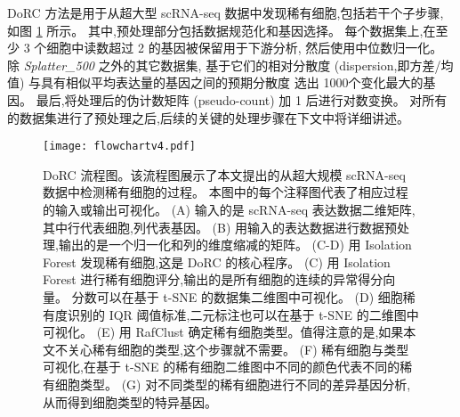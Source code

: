 DoRC 方法是用于从超大型 scRNA-seq 数据中发现稀有细胞,包括若干个子步骤,如图 \ref{fig:flowchart} 所示。
其中,预处理部分包括数据规范化和基因选择。
每个数据集上,在至少 3 个细胞中读数超过 2 的基因被保留用于下游分析,
然后使用中位数归一化。
除 \textit{Splatter\_500} 之外的其它数据集,
基于它们的相对分散度 (dispersion,即方差/均值) 与具有相似平均表达量的基因之间的预期分散度 选出 1000个变化最大的基因。
最后,将处理后的伪计数矩阵 (pseudo-count) 加 1 后进行对数变换。
对所有的数据集进行了预处理之后,后续的关键的处理步骤在下文中将详细讲述。

\begin{figure}[!htbp]
    \centering
    \texttt{[image: flowchartv4.pdf]}
    \caption{DoRC 流程图。该流程图展示了本文提出的从超大规模 scRNA-seq 数据中检测稀有细胞的过程。
    本图中的每个注释图代表了相应过程的输入或输出可视化。
    (A) 输入的是 scRNA-seq 表达数据二维矩阵,其中行代表细胞,列代表基因。
    (B) 用输入的表达数据进行数据预处理,输出的是一个归一化和列的维度缩减的矩阵。
    (C-D) 用 Isolation Forest 发现稀有细胞,这是 DoRC 的核心程序。
    (C) 用 Isolation Forest 进行稀有细胞评分,输出的是所有细胞的连续的异常得分向量。
    分数可以在基于 t-SNE 的数据集二维图中可视化。
    (D) 细胞稀有度识别的 IQR 阈值标准,二元标注也可以在基于 t-SNE 的二维图中可视化。
    (E) 用 RafClust 确定稀有细胞类型。值得注意的是,如果本文不关心稀有细胞的类型,这个步骤就不需要。
    (F) 稀有细胞与类型可视化,在基于 t-SNE 的稀有细胞二维图中不同的颜色代表不同的稀有细胞类型。
    (G) 对不同类型的稀有细胞进行不同的差异基因分析,从而得到细胞类型的特异基因。
    }
    \label{fig:flowchart}
\end{figure}

